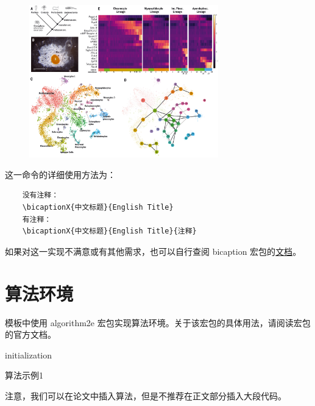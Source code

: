 \begin{figure}[htb] 
	\centering
	\includegraphics[width=0.73\textwidth]{image/sponge-celltype.jpg}
	\label{fig:sponge}
\end{figure}

这一命令的详细使用方法为：

\begin{verbatim}
	没有注释：
	\bicaptionX{中文标题}{English Title}
	有注释：
	\bicaptionX{中文标题}{English Title}{注释}	
\end{verbatim}

如果对这一实现不满意或有其他需求，也可以自行查阅 bicaption 宏包的\href{https://sg.mirrors.cicku.me/ctan/macros/latex/contrib/caption/bicaption.pdf}{文档}。

\section{算法环境}
\label{sec:algorithm}
模板中使用 algorithm2e 宏包实现算法环境。关于该宏包的具体用法，请阅读宏包的官方文档。

\normalem
\begin{algorithm}[h]
	\SetAlgoLined
  
	initialization\;
	\caption{算法示例1}
	\label{algo:algorithm1}
  \end{algorithm}
  \ULforem

  注意，我们可以在论文中插入算法，但是不推荐在正文部分插入大段代码。